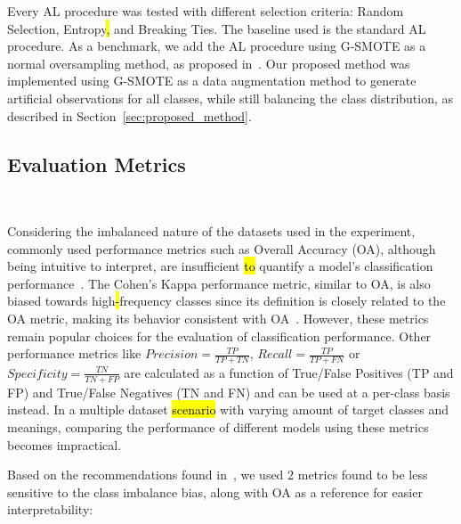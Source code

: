 \documentclass[preprint, 12pt]{elsarticle}
\begin{document}
Every AL procedure was tested with different selection criteria: Random
Selection, Entropy\hl{,} and Breaking Ties. The baseline used is the standard
AL procedure. As a benchmark, we add the AL procedure using G-SMOTE as a
normal oversampling method, as proposed in~\cite{Fonseca2021}. Our proposed
method was implemented using G-SMOTE as a data augmentation method to generate
artificial observations for all classes, while still balancing the class
distribution, as described in Section~\ref{sec:proposed_method}. 
 
\subsection{Evaluation Metrics}~\label{sec:evaluation_metrics}

Considering the imbalanced nature of the datasets used in the experiment,
commonly used performance metrics such as Overall Accuracy (OA), although
being intuitive to interpret, are insufficient \hl{to} quantify a model's
classification performance~\cite{Jeni2013}. The Cohen's Kappa performance
metric, similar to OA, is also biased towards high\hl{-}frequency classes
since its definition is closely related to the OA metric, making its behavior
consistent with OA~\cite{Fatourechi2008}. However, these metrics remain
popular choices for the evaluation of classification performance. Other
performance metrics like $Precision = \frac{TP}{TP+TN}$, $Recall =
\frac{TP}{TP+FN}$ or $Specificity = \frac{TN}{TN + FP}$ are calculated as a
function of True/False Positives (TP and FP) and True/False Negatives (TN and
FN) and can be used at a per-class basis instead. In a multiple dataset
\hl{scenario} with varying amount of target classes and meanings, comparing
the performance of different models using these metrics becomes impractical.
 
Based on the recommendations found in~\cite{Jeni2013, Kubat1997}, we used 2
metrics found to be less sensitive to the class imbalance bias, along with OA
as a reference for easier interpretability:
\end{document}
